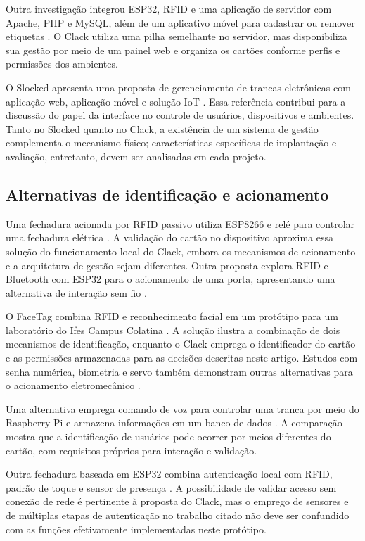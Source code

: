 \documentclass[12pt]{article}
\begin{document}
Outra investigação integrou ESP32, RFID e uma aplicação de servidor com Apache, PHP e MySQL, além de um aplicativo móvel para cadastrar ou remover etiquetas \cite{costa2020esp32rfid}. O Clack utiliza uma pilha semelhante no servidor, mas disponibiliza sua gestão por meio de um painel web e organiza os cartões conforme perfis e permissões dos ambientes.

O Slocked apresenta uma proposta de gerenciamento de trancas eletrônicas com aplicação web, aplicação móvel e solução IoT \cite{dantas2025slocked}. Essa referência contribui para a discussão do papel da interface no controle de usuários, dispositivos e ambientes. Tanto no Slocked quanto no Clack, a existência de um sistema de gestão complementa o mecanismo físico; características específicas de implantação e avaliação, entretanto, devem ser analisadas em cada projeto.

\subsection{Alternativas de identificação e acionamento}

Uma fechadura acionada por RFID passivo utiliza ESP8266 e relé para controlar uma fechadura elétrica \cite{borin2023fechadura}. A validação do cartão no dispositivo aproxima essa solução do funcionamento local do Clack, embora os mecanismos de acionamento e a arquitetura de gestão sejam diferentes. Outra proposta explora RFID e Bluetooth com ESP32 para o acionamento de uma porta, apresentando uma alternativa de interação sem fio \cite{filho2024rfid}.

O FaceTag combina RFID e reconhecimento facial em um protótipo para um laboratório do Ifes Campus Colatina \cite{moreira2022facetag}. A solução ilustra a combinação de dois mecanismos de identificação, enquanto o Clack emprega o identificador do cartão e as permissões armazenadas para as decisões descritas neste artigo. Estudos com senha numérica, biometria e servo também demonstram outras alternativas para o acionamento eletromecânico \cite{santos2024senha,santos2023fechadura}.

Uma alternativa emprega comando de voz para controlar uma tranca por meio do Raspberry Pi e armazena informações em um banco de dados \cite{barbosa_travas}. A comparação mostra que a identificação de usuários pode ocorrer por meios diferentes do cartão, com requisitos próprios para interação e validação.

Outra fechadura baseada em ESP32 combina autenticação local com RFID, padrão de toque e sensor de presença \cite{pawar2026smart}. A possibilidade de validar acesso sem conexão de rede é pertinente à proposta do Clack, mas o emprego de sensores e de múltiplas etapas de autenticação no trabalho citado não deve ser confundido com as funções efetivamente implementadas neste protótipo.
\end{document}
